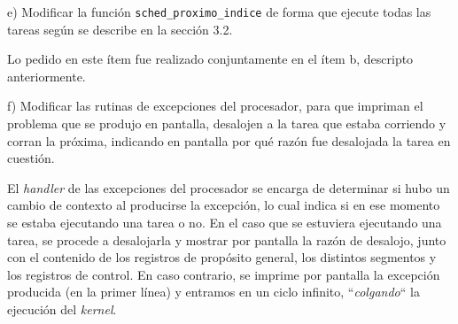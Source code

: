 \vspace*{0.5cm} \noindent



\noindent
e) Modificar la funci\'on \verb|sched_proximo_indice| de forma que ejecute todas las tareas seg\'un se describe en la secci\'on 3.2. 


\vspace*{0.3cm}

Lo pedido en este \'item fue realizado conjuntamente en el \'item b, descripto anteriormente.

\vspace*{0.5cm} \noindent



\noindent
f) Modificar las rutinas de excepciones del procesador, para que impriman el problema que se produjo en pantalla, desalojen a la tarea 
que estaba corriendo y corran la pr\'oxima, indicando en pantalla por qu\'e raz\'on fue desalojada la tarea en cuesti\'on. 


\vspace*{0.3cm}

El \textit{handler} de las excepciones del procesador se encarga de determinar si hubo un cambio de contexto al producirse la excepci\'on, 
lo cual indica si en ese momento se estaba ejecutando una tarea o no. En el caso que se estuviera ejecutando una tarea, se procede a 
desalojarla y mostrar por pantalla la raz\'on de desalojo, junto con el contenido de los registros de prop\'osito general, los distintos 
segmentos y los registros de control. En caso contrario, se imprime por pantalla la excepci\'on producida (en la primer l\'inea) y entramos 
en un ciclo infinito, ``\textit{colgando}`` la ejecuci\'on del \textit{kernel}.

\vspace*{0.5cm} \noindent